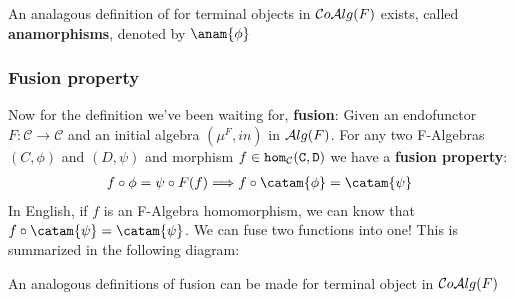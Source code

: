 An analagous definition of for terminal objects in $\mathcal{C}o\mathcal{A}lg(F)$ exists, called \textbf{anamorphisms}, denoted by $\anam{\phi}$

\subsubsection{Fusion property}\label{sec:fusion_prop}
Now for the definition we've been waiting for, \textbf{fusion}:
Given an endofunctor $F:\mathcal{C}\to\mathcal{C}$ and an initial algebra $(\mu^F,in)$ in $\mathcal{A}lg(F)$. For any two F-Algebras $(C,\phi)$ and $(D,\psi)$ and morphism $f\in\tt{hom}_\mathcal{C}(C,D)$ we have a \textbf{fusion property}: \begin{align*} f\circ\phi=\psi\circ F(f) \Longrightarrow f\circ\catam{\phi}=\catam{\psi} \end{align*}
In English, if $f$ is an F-Algebra homomorphism, we can know that $f\circ\catam{\psi}=\catam{\psi}$. We can fuse two functions into one! This is summarized in the following diagram:
\begin{figure}[H]\vspace{-1em}\hfill
{}\hfill\null
\end{figure}\vspace{-1em}
An analogous definitions of fusion can be made for terminal object in $\mathcal{C}o\mathcal{A}lg(F)$





